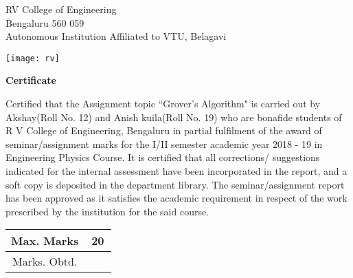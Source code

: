 \documentclass[a4paper]{article}
\begin{document}
\begin{titlepage}
   \begin{center}
       \vspace*{1cm}

       RV College of Engineering\\
       Bengaluru 560 059\\
       Autonomous Institution Affiliated to VTU, Belagavi

       \vspace{2.5cm}

       \texttt{[image: rv]}
       \vspace{0.5cm}

       \textbf{Certificate}
   \end{center}

       \vspace{0.5cm}

       Certified that the Assignment topic ``Grover’s Algorithm" is carried out by
       Akshay(Roll No. 12) and Anish kuila(Roll No. 19) who are bonafide students
       of R V College of Engineering, Bengaluru in partial fulfilment of the
       award of seminar/assignment marks for the I/II semester academic year
       2018 - 19 in Engineering Physics Course. It is certified that all
       corrections/ suggestions indicated for the internal assessment have been
       incorporated in the report, and a soft copy is deposited in the
       department library. The seminar/assignment report has been approved as
       it satisfies the academic requirement in respect of the work prescribed
       by the institution for the said course.

       \vspace{1.5cm}

       \begin{table}[h!]
           \begin{tabular}{ |c|c| }
               \hline
               Max. Marks & 20\\
               \hline
               Marks. Obtd. & ~~~\\
               \hline
           \end{tabular}
       \end{table}

       \vspace{0.8cm}

\end{titlepage}

\tableofcontents
\pagebreak
\end{document}
